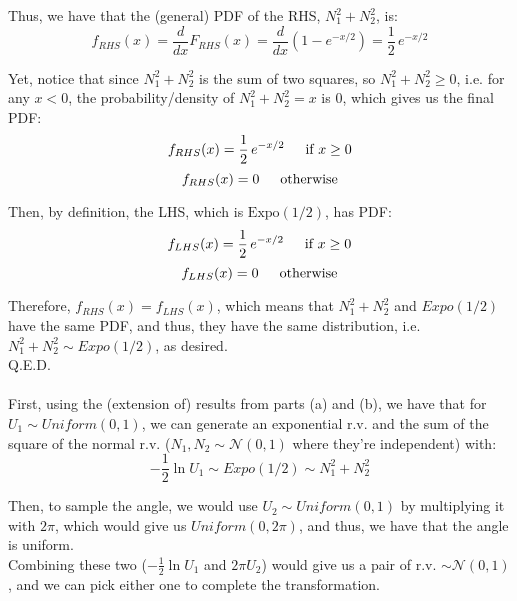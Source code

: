\documentclass{article}
\begin{document}
Thus, we have that the (general) PDF of the RHS, $N_1^2 + N_2^2$, is:
$$f_{RHS}(x) = \frac{d}{dx} F_{RHS}(x) = \frac{d}{dx} (1 - e^{-x/2}) =
\frac{1}{2}\, e^{-x/2} $$

Yet, notice that since $N_1^2 + N_2^2$ is the sum of two squares, so $N_1^2 + N_2^2 \geq 0$, i.e. for any $x < 0$, the probability/density of $N_1^2 + N_2^2 = x$ is 0, which gives us the final PDF:
$$f_{RHS}(x) = \frac{1}{2}\, e^{-x/2} \indent \text{if } x\geq 0$$
$$f_{RHS}(x) = 0 \indent \text{otherwise}$$

Then, by definition, the LHS, which is $\text{Expo}(1/2)$, has PDF:
$$f_{LHS}(x) = \frac{1}{2}\, e^{-x/2}\indent \text{if } x\geq0$$
$$f_{LHS}(x) = 0 \indent \text{otherwise}$$

Therefore, $f_{RHS}(x) = f_{LHS}(x)$, which means that $N_1^2 + N_2^2$ and $Expo(1/2)$ have the same PDF, and thus, they have the same distribution, i.e. $N_1^2 + N_2^2\sim Expo(1/2)$, as desired. \\

Q.E.D. \\



 \\

First, using the (extension of) results from parts (a) and (b), we have that for
$U_1\sim Uniform(0,1)$, we can generate an exponential r.v. and the sum of the square of the normal r.v. ($N_1, N_2\sim\mathscr{N}(0,1)$ where they're independent) with:
$$-\frac{1}{2}\ln U_1 \sim Expo(1/2) \sim N_1^2+N_2^2$$

Then, to sample the angle, we would use $U_2\sim Uniform(0,1)$ by multiplying it with $2\pi$, which would give us $Uniform(0, 2\pi)$, and thus, we have that the angle is uniform. \\

Combining these two ($-\frac{1}{2}\ln U_1$ and $2\pi U_2$) would give us a pair of r.v. $\sim\mathscr{N}(0,1)$, and we can pick either one to complete the transformation.
\end{document}
